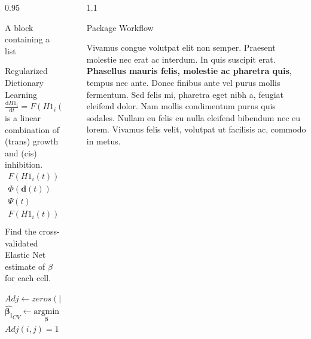 \documentclass[final]{beamer}
\newlength{\sepwidth}
\newlength{\colwidth}
\newcommand{\separatorcolumn}{\begin{column}{\sepwidth}\end{column}}
\begin{document}
\begin{frame}[t]
\begin{columns}[t]
\begin{column}{0.95\colwidth}
\begin{block}{A block containing a list}
  \end{block}

  \begin{alertblock}{Regularized Dictionary Learning}
    $\frac{\mathrm d \textit{H1}_i}{\mathrm dt} = F(\textit{H1}_i(t))$ is a linear combination of (trans) growth and (cis) inhibition.
    \begin{equation}\label{eq:state}
    \begin{split}
    F(\textit{H1}_i(t)) &= \text{the interpolant of } \textit{H1}_i(t)\\
    \Phi(\bm{d}(t)) &= \text{Hill-type transformations over Delta protein levels} \\
    \Psi(t) &=  \left[\Phi(\bm{d}(t)), \textit{H1}(t) \right] \\
    F(\textit{H1}_i(t)) &\approx \Psi(t) \bm{\beta_i} \\[1em]
    \end{split}
    \end{equation}
    Find the cross-validated Elastic Net estimate \cite{zou_regularization_2005} of $\beta$ for each cell.\\[1em]	
    \centering
    \begin{minipage}{0.7\textwidth}
      \begin{algorithmic}
        \STATE $Adj\gets zeros(|Cells|)$
        \STATE $\bm{\hat{\beta_i}}_{CV} \gets \underset{\bm{\beta}}{\mathrm{argmin}} \left( \big|F(H1_i(t)) - \Psi(t)\bm{\beta} \big|^2 + \lambda_2 \big| \beta \big|^2 + \lambda_1 \big|\beta \big|_1  \right)$
        \STATE $Adj(i,j) = 1$
        \ENDIF
        \ENDFOR
        \ENDFOR 
      \end{algorithmic}
    \end{minipage}
    \normalsize
  \end{alertblock}

\end{column}

\separatorcolumn

\begin{column}{1.1\colwidth}

  \begin{block}{Package Workflow}

    Vivamus congue volutpat elit non semper. Praesent molestie nec erat ac
    interdum. In quis suscipit erat. \textbf{Phasellus mauris felis, molestie
    ac pharetra quis}, tempus nec ante. Donec finibus ante vel purus mollis
    fermentum. Sed felis mi, pharetra eget nibh a, feugiat eleifend dolor. Nam
    mollis condimentum purus quis sodales. Nullam eu felis eu nulla eleifend
    bibendum nec eu lorem. Vivamus felis velit, volutpat ut facilisis ac,
    commodo in metus.
    

\end{block}
\end{column}
\end{columns}
\end{frame}
\end{document}
